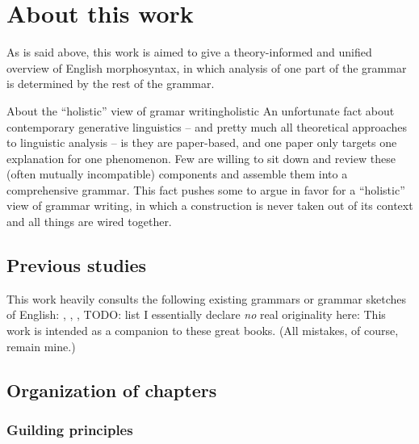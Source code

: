 \documentclass[UTF8, a4paper, oneside, scheme=plain]{ctexrep}
\begin{document}
\section{About this work}

As is said above,
this work is aimed to give a theory-informed and unified overview of English morphosyntax,
in which analysis of one part of the grammar is determined by the rest of the grammar.

\begin{infobox}{About the ``holistic'' view of gramar writing}{holistic}
    An unfortunate fact about contemporary generative linguistics -- 
    and pretty much all theoretical approaches to linguistic analysis -- 
    is they are paper-based,
    and one paper only targets one explanation for one phenomenon.
    Few are willing to sit down 
    and review these (often mutually incompatible) components 
    and assemble them into a comprehensive grammar. 
    This fact pushes some to argue in favor for a ``holistic'' view of grammar writing,
    in which a construction is never taken out of its context 
    and all things are wired together.
\end{infobox}

\subsection{Previous studies}

This work heavily consults the following existing grammars or grammar sketches of English:
\citet{cgel}, \citet{dixon2005semantic}, \citet{quirk1985}, TODO: list 
I essentially declare \emph{no} real originality here: 
This work is intended as a companion to these great books.
(All mistakes, of course, remain mine.)

\subsection{Organization of chapters}\label{sec:introduction.organization}

\subsubsection{Guilding principles}
\end{document}
